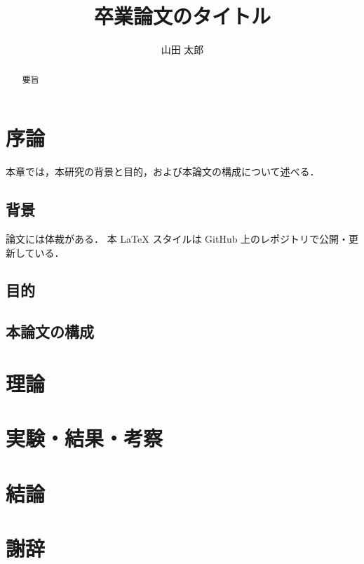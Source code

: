 \documentclass[a4paper,dvipdfmx,11pt]{jsreport}
\title{卒業論文のタイトル}
\author{山田 太郎}
\begin{document}
\begin{abstract}
    要旨
\end{abstract}

\maketitle

\tableofcontents

\chapter{序論}
本章では，本研究の背景と目的，および本論文の構成について述べる．
\section{背景}
論文には体裁がある．
本 LaTeX スタイルは GitHub 上のレポジトリ\cite{miino2023github}で公開・更新している．
\clearpage
\section{目的}
\clearpage
\section{本論文の構成}

\chapter{理論}

\chapter{実験・結果・考察}

\chapter{結論}

\chapter*{謝辞}


\end{document}
